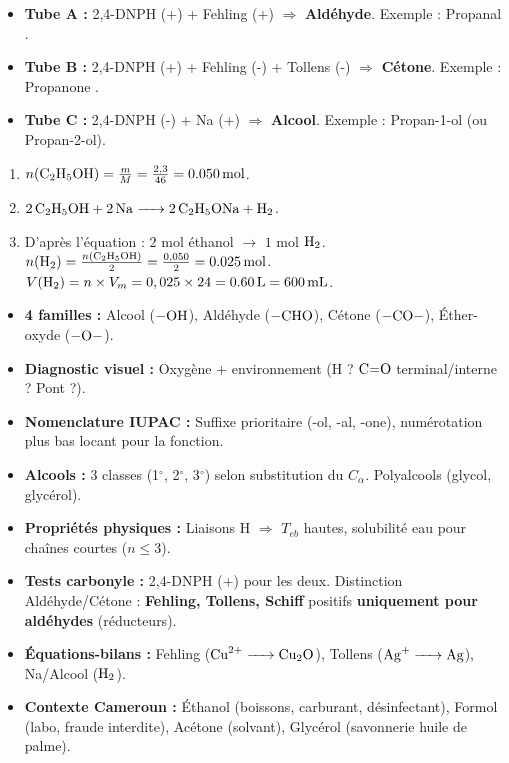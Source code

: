 \documentclass[11pt]{article}
\begin{document}
\begin{corrige}
\begin{itemize}
\item \textbf{Tube A :} 2,4-DNPH (+) + Fehling (+) $\Rightarrow$ \textbf{Aldéhyde}. Exemple  : Propanal .
\item \textbf{Tube B :} 2,4-DNPH (+) + Fehling (-) + Tollens (-) $\Rightarrow$ \textbf{Cétone}. Exemple  : Propanone .
\item \textbf{Tube C :} 2,4-DNPH (-) + Na (+) $\Rightarrow$ \textbf{Alcool}. Exemple  : Propan-1-ol  (ou Propan-2-ol).
\end{itemize}
\end{corrige}

\begin{corrige}
\begin{enumerate}
\item $n(\ce{C2H5OH}) = \frac{m}{M} = \frac{2,3}{46} = \SI{0,050}{mol}$.
\item $\ce{2 C2H5OH + 2 Na -> 2 C2H5ONa + H2}$.
\item D'après l'équation : $2$ mol éthanol $\rightarrow$ $1$ mol $\ce{H2}$.
      $n(\ce{H2}) = \frac{n(\ce{C2H5OH})}{2} = \frac{0,050}{2} = \SI{0,025}{mol}$.
      $V(\ce{H2}) = n \times V_m = 0,025 \times 24 = \SI{0,60}{L} = \SI{600}{mL}$.
\end{enumerate}
\end{corrige}

\begin{aretenir}
\begin{itemize}
\item \textbf{4 familles :} Alcool ($-\ce{OH}$), Aldéhyde ($-\ce{CHO}$), Cétone ($-\ce{CO}-$), Éther-oxyde ($-\ce{O}-$).
\item \textbf{Diagnostic visuel :} Oxygène + environnement (H ? $\ce{C=O}$ terminal/interne ? Pont ?).
\item \textbf{Nomenclature IUPAC :} Suffixe prioritaire (-ol, -al, -one), numérotation plus bas locant pour la fonction.
\item \textbf{Alcools :} 3 classes (1$^\circ$, 2$^\circ$, 3$^\circ$) selon substitution du $C_\alpha$. Polyalcools (glycol, glycérol).
\item \textbf{Propriétés physiques :} Liaisons H $\Rightarrow$ $T_{eb}$ hautes, solubilité eau pour chaînes courtes ($n\le3$).
\item \textbf{Tests carbonyle :} 2,4-DNPH (+) pour les deux. Distinction Aldéhyde/Cétone : \textbf{Fehling, Tollens, Schiff} positifs \textbf{uniquement pour aldéhydes} (réducteurs).
\item \textbf{Équations-bilans :} Fehling ($\ce{Cu^2+ -> Cu2O}$), Tollens ($\ce{Ag+ -> Ag}$), Na/Alcool ($\ce{H2}$).
\item \textbf{Contexte Cameroun :} Éthanol (boissons, carburant, désinfectant), Formol (labo, fraude interdite), Acétone (solvant), Glycérol (savonnerie huile de palme).
\end{itemize}
\end{aretenir}
\end{document}
